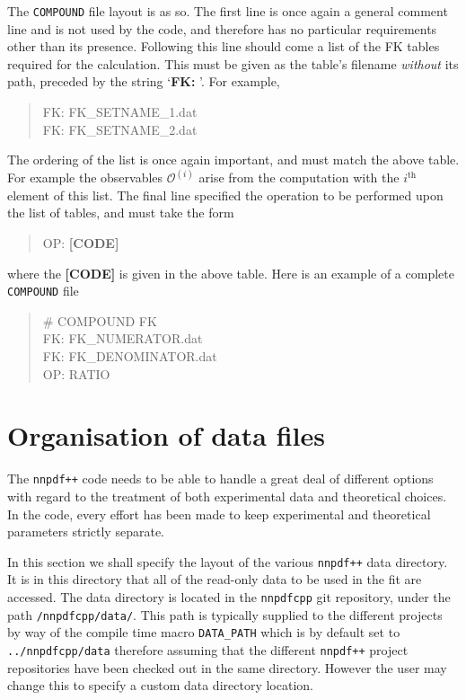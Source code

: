 \documentclass[11pt]{article}
\begin{document}
The {\tt COMPOUND} file layout is as so. The first line is once again a general comment line and is not used by the code, and therefore has no particular requirements other than its presence. Following this line should come a list of the {\tt} FK tables required for the calculation. This must be given as the table's filename \emph{without} its path, preceded by the string `\textbf{FK: }'. For example,

\begin{quotation}\noindent
FK: FK\_SETNAME\_1.dat\\
FK: FK\_SETNAME\_2.dat
\end{quotation}

The ordering of the list is once again important, and must match the above table. For example the observables $\mathcal{O}^{(i)}$ arise from the computation with the $i^{\text{th}}$ element of this list. The final line specified the operation to be performed upon the list of tables, and must take the form

\begin{quotation}\noindent
OP: \textbf{[CODE]}
\end{quotation}
where the \textbf{[CODE]} is given in the above table. Here is an example of a complete {\tt COMPOUND} file

\begin{quotation}\noindent
\# COMPOUND FK\\
FK: FK\_NUMERATOR.dat\\
FK: FK\_DENOMINATOR.dat\\
OP: RATIO
\end{quotation}

\clearpage
\section{Organisation of data files} \label{sec:org}
The {\tt nnpdf++} code needs to be able to handle a great deal of different options with regard to the treatment of both experimental data
and theoretical choices. In the code, every effort has been made to keep experimental and theoretical parameters strictly separate.

In this section we shall specify the layout of the various {\tt nnpdf++} data directory. It is in this directory that all of the read-only data to be used in
the fit are accessed. The data directory is located in the {\tt nnpdfcpp} git repository, under the path {\tt /nnpdfcpp/data/}. This path is typically supplied to the different projects by way of the compile time macro {\tt DATA\_PATH} which is by default set to {\tt ../nnpdfcpp/data} therefore assuming that the different {\tt nnpdf++} project repositories have been checked out in the same directory. However the user may change this to specify a custom data directory location.
\end{document}

